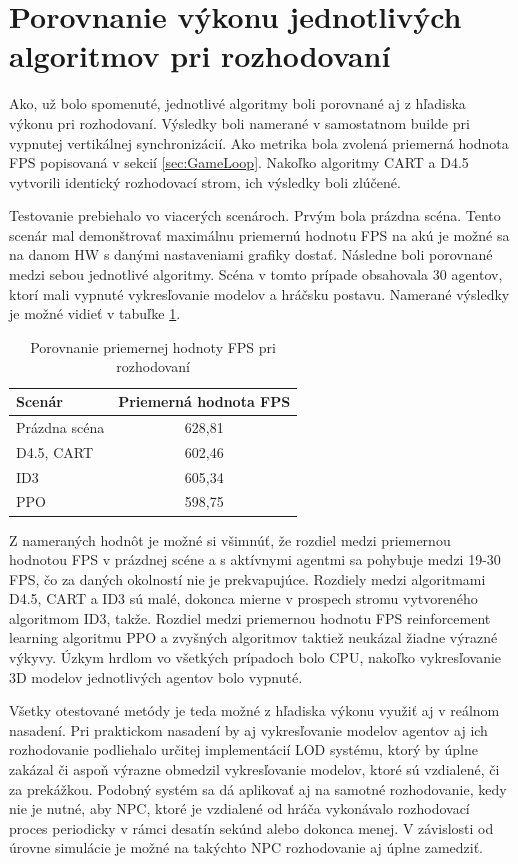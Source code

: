 \documentclass[slovak, master]{diploma}
\begin{document}
\section{Porovnanie výkonu jednotlivých algoritmov pri rozhodovaní}
\label{sec:editorPerformance}
Ako, už bolo spomenuté, jednotlivé algoritmy boli porovnané aj z hľadiska výkonu pri rozhodovaní. Výsledky boli namerané v samostatnom builde pri vypnutej vertikálnej synchronizácií. Ako metrika bola zvolená priemerná hodnota FPS popisovaná v sekcií \ref{sec:GameLoop}. Nakoľko algoritmy CART a D4.5 vytvorili identický rozhodovací strom, ich výsledky boli zlúčené. 

Testovanie prebiehalo vo viacerých scenároch. Prvým bola prázdna scéna. Tento scenár mal demonštrovať maximálnu priemernú hodnotu FPS na akú je možné sa na danom HW s danými nastaveniami grafiky dostať. Následne boli porovnané medzi sebou jednotlivé algoritmy. Scéna v tomto prípade obsahovala 30 agentov, ktorí mali vypnuté vykresľovanie modelov a hráčsku postavu. Namerané výsledky je možné vidieť v tabuľke \ref{tab:benchmarksGame}.

\begin{table}[!ht]
    \centering
    \begin{tabular}{|l|c|}
    \hline
        \textbf{Scenár} & \textbf{Priemerná hodnota FPS} \\ \hline
        Prázdna scéna & 628,81 \\ 
        D4.5, CART & 602,46 \\ 
        ID3 & 605,34 \\ 
        PPO & 598,75 \\ \hline
    \end{tabular}
    \caption{Porovnanie priemernej hodnoty FPS pri rozhodovaní}
    \label{tab:benchmarksGame}
\end{table}

Z nameraných hodnôt je možné si všimnúť, že rozdiel medzi priemernou hodnotou FPS v prázdnej scéne a s aktívnymi agentmi sa pohybuje medzi 19-30 FPS, čo za daných okolností nie je prekvapujúce. Rozdiely medzi algoritmami D4.5, CART a ID3 sú malé, dokonca mierne v prospech stromu vytvoreného algoritmom ID3, takže. Rozdiel medzi priemernou hodnotu FPS reinforcement learning algoritmu PPO a zvyšných algoritmov taktiež neukázal žiadne výrazné výkyvy. Úzkym hrdlom vo všetkých prípadoch bolo CPU, nakoľko vykresľovanie 3D modelov jednotlivých agentov bolo vypnuté. 

Všetky otestované metódy je teda možné z hľadiska výkonu využiť aj v reálnom nasadení. Pri praktickom nasadení by aj vykresľovanie modelov agentov aj ich rozhodovanie podliehalo určitej implementácií LOD systému, ktorý by úplne zakázal či aspoň výrazne obmedzil vykresľovanie modelov, ktoré sú vzdialené, či za prekážkou. Podobný systém sa dá aplikovať aj na samotné rozhodovanie, kedy nie je nutné, aby NPC, ktoré je vzdialené od hráča vykonávalo rozhodovací proces periodicky v rámci desatín sekúnd alebo dokonca menej. V závislosti od úrovne simulácie je možné na takýchto NPC rozhodovanie aj úplne zamedziť.
\end{document}
